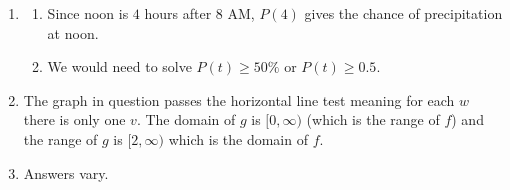\documentclass{ximera}
\begin{document}
\begin{enumerate}
\begin{enumerate}
\item  $A(P+50)$ is how much is in the retirement account in 30 years if $\$ 50$ is added to the monthly payment $P$.  $A(P)+50$ represents the amount of money in the retirement account after 30 years if $\$P$  is invested each month plus an additional $\$50$.  $A(P)+A(50)$ is the sum of money from two retirement accounts after 30 years: one with monthly payment $\$P$ and one with monthly payment $\$50$.

\end{enumerate}

\item  

\begin{enumerate}

\item  Since noon is $4$ hours after 8 AM, $P(4)$ gives the chance of precipitation at noon.

\item  We would need to solve $P(t) \geq 50 \%$ or $P(t) \geq 0.5$.

\end{enumerate}


\item The graph in question passes the horizontal line test meaning for each $w$ there is only one $v$.    The domain of $g$ is $[0, \infty)$ (which is the range of $f$) and the range of $g$ is $[2, \infty)$ which is the domain of $f$.  

\item  Answers vary.  

\end{enumerate}
\end{document}
